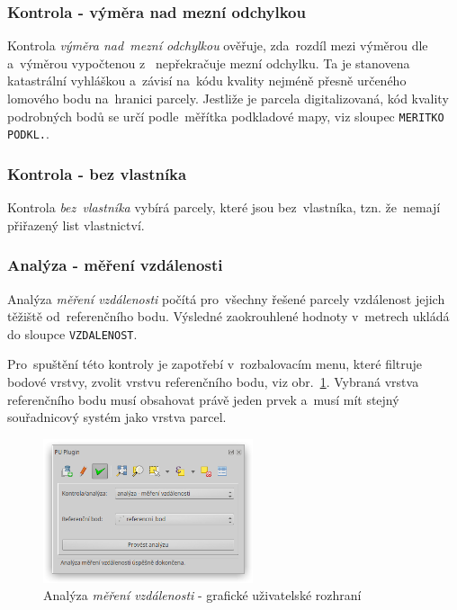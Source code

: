 \subsubsection{Kontrola - výměra nad mezní odchylkou}
\label{manual_kontrola_vymera}

Kontrola \textit{výměra nad~mezní odchylkou} ověřuje, zda~rozdíl mezi výměrou dle~ a~výměrou vypočtenou z~ nepřekračuje mezní odchylku. Ta je stanovena katastrální vyhláškou a~závisí na~kódu kvality nejméně přesně určeného lomového bodu na~hranici parcely. Jestliže je parcela digitalizovaná, kód kvality podrobných bodů se určí podle~měřítka podkladové mapy, viz sloupec \texttt{MERITKO PODKL.}.

\subsubsection{Kontrola - bez vlastníka}
\label{manual_kontrola_bez_vlastnika}

Kontrola \textit{bez~vlastníka} vybírá parcely, které jsou bez~vlastníka, tzn. že~nemají přiřazený list vlastnictví.

\subsubsection{Analýza - měření vzdálenosti}
\label{manual_analyza_vzdalenosti}

Analýza \textit{měření vzdálenosti} počítá pro~všechny řešené parcely vzdálenost jejich těžiště od~referenčního bodu. Výsledné zaokrouhlené hodnoty v~metrech ukládá do sloupce \texttt{VZDALENOST}.

Pro~spuštění této kontroly je zapotřebí v~rozbalovacím menu, které filtruje bodové vrstvy, zvolit vrstvu referenčního bodu, viz obr.~\ref{fig:manual_analyza_vzdalenosti_gui}. Vybraná vrstva referenčního bodu musí obsahovat právě jeden prvek a~musí mít stejný souřadnicový systém jako vrstva parcel.

	\begin{figure}[H]
		\centering
		\includegraphics[width=0.55\textwidth]{./pictures/analyza_vzdalenost.png}
		\caption[Analýza \textit{měření vzdálenosti} - grafické uživatelské rozhraní]{Analýza \textit{měření vzdálenosti} - grafické uživatelské rozhraní}
		\label{fig:manual_analyza_vzdalenosti_gui}
 	\end{figure}

